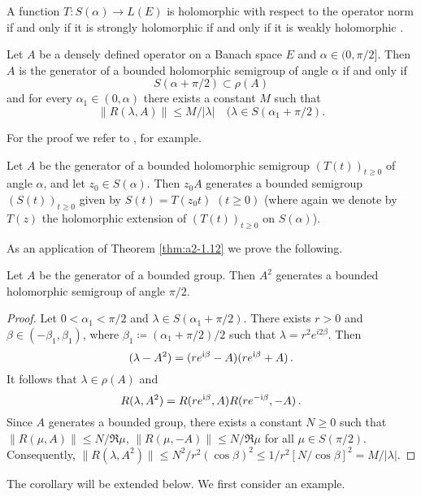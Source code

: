 \begin{remark*}\label{rem:a2-1.5-kgk}
A function $T \colon S(\alpha) \to L(E)$ is holomorphic with respect to the operator norm if and only if it is strongly holomorphic if and only if it is weakly holomorphic \citet[V.3]{yosida:1965}.
\end{remark*}

\begin{theorem}\label{thm:a2-1.12}
Let $A$ be a densely defined operator on a Banach space $E$ and $\alpha \in (0,\pi/2]$.
Then $A$ is the generator of a bounded holomorphic semigroup of angle $\alpha$ if and only if 
\[
S(\alpha + \pi/2) \subset \rho(A)
\]
and for every $\alpha_{1} \in (0,\alpha)$ there exists a constant $M$ such that
\begin{equation}\label{eq:a2-1.6}
    \|R(\lambda,A)\| \leq M/|\lambda| \quad (\lambda \in S(\alpha_{1} + \pi/2). 
\end{equation}
\end{theorem}
For the proof we refer to \citet{davies:1980}, for example.

\begin{remark*}\label{rem:a2-1.6-kgk}
Let $A$ be the generator of a bounded holomorphic semigroup $(T(t))_{t \geq 0}$ 
of angle $\alpha$, and let $z_{0} \in S(\alpha)$.
Then $z_{0}A$ generates a bounded semigroup 
$(S(t))_{t \geq 0}$ given by $S(t) = T(z_{0}t)$  $(t \geq 0)$ (where again we denote by $T(z)$ the holomorphic extension of $(T(t))_{t \geq 0}$ on $S(\alpha)$).
\end{remark*}
As an application of Theorem \ref{thm:a2-1.12}  we prove the following.
\begin{corollary}\label{cor:a2-1.13}
Let $A$ be the generator of a bounded group.
Then $A^{2}$ generates a bounded holomorphic semigroup of angle $\pi/2$.
\end{corollary}
\begin{proof}
Let $0 < \alpha_{1} < \pi/2$ and $\lambda \in S(\alpha_{1} + \pi/2)$.
There exists $r > 0$ and $\beta \in (-\beta_{1},\beta_{1})$,
where $\beta_{1} \coloneqq (\alpha_{1} + \pi/2)/2$
such that $\lambda = r^{2}e^{i2\beta}$.
Then 
\[
(\lambda - A^{2}) = (re^{\mathrm{i}\beta} - A)(re^{\mathrm{i}\beta} + A) \, .
\] 
It follows that $\lambda \in \rho(A)$ and 
\begin{equation}\label{eq:a2-1.7}
    R(\lambda,A^{2}) = R(re^{\mathrm{i}\beta},A)R(re^{-\mathrm{i}\beta},-A) \, .
\end{equation}
Since $A$ generates a bounded group, there exists a constant $N \geq 0$ such that \\ 
$\|R(\mu,A)\| \leq N/\Re\mu$, $\|R(\mu,-A)\| \leq N/\Re\mu$ for all $\mu \in S(\pi/2)$.
Consequently, $\|R(\lambda,A^{2})\| \leq N^{2}/r^{2}(\cos\beta)^{2} \leq 1/r^{2}[N/\cos\beta]^{2} = M/|\lambda|$.
\end{proof}
The corollary will be extended below.
We first consider an example.

